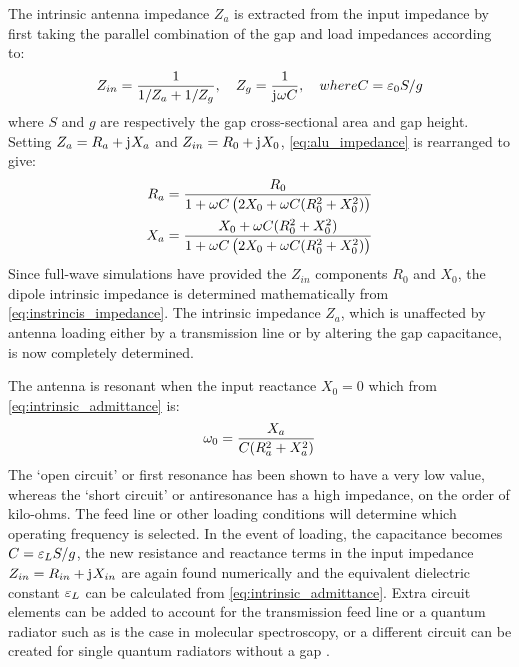 \documentclass[11pt]{article}
\begin{document}
The intrinsic antenna impedance $Z_a$ is extracted from the input impedance by first taking the parallel combination of the gap and load impedances according to:
%
\begin{equation}
  Z_{in} = \frac{1}{1 / Z_a + 1 / Z_g}, \quad  Z_g = \frac{1}{\mathrm{j}\mkern1mu \omega C}, \quad where C = \varepsilon_0 S/g
  \label{eq:alu_impedance}
\end{equation}
%
where $S$ and $g$ are respectively the gap cross-sectional area and gap height. Setting $Z_a = R_a + \mathrm{j}\mkern1mu X_a$ and $Z_{in} = R_0 + \mathrm{j}\mkern1mu X_0$,  \eqref{eq:alu_impedance} is rearranged to give:
%
\begin{subequations}
  \begin{align}
    R_a ={}& \frac{R_0}{1 + \omega C \left( 2 X_0 + \omega C (R_0^2 + X_0^2) \right)}
    \label{eq:intrinsic_resistance}\\
    X_a ={}& \frac{X_0 + \omega C (R_0^2 + X_0^2)} {1 + \omega C\left( 2 X_0 + \omega C (R_0^2 + X_0^2) \right)}
    \label{eq:intrinsic_admittance}
  \end{align}
  \label{eq:instrincis_impedance}
\end{subequations}
%
Since full-wave simulations have provided the $Z_{in}$ components $R_0$ and $X_0$, the dipole intrinsic impedance is determined mathematically from \eqref{eq:instrincis_impedance}. The intrinsic impedance $Z_a$, which is unaffected by antenna loading either by a transmission line or by altering the gap capacitance, is now completely determined.

The antenna is resonant when the input reactance $X_0 = 0$ which from \eqref{eq:intrinsic_admittance} is:
%
\begin{equation}
  \omega_{0} = \frac{X_a}{C (R_a^2 + X_a^2)}
  \label{eq:resonant_frequency_impedance}
\end{equation}
%
The `open circuit' or first resonance has been shown to have a very low value, whereas the `short circuit' or antiresonance has a high impedance, on the order of kilo-ohms. The feed line or other loading conditions will determine which operating frequency is selected. In the event of loading, the capacitance becomes $C = \varepsilon_L S /g$, the new resistance and reactance terms in the input impedance $Z_{in} = R_{in} + \mathrm{j}\mkern1mu X_{in}$ are again found numerically and the equivalent dielectric constant $\varepsilon_L$ can be calculated from \eqref{eq:intrinsic_admittance}. Extra circuit elements can be added to account for the transmission feed line or a quantum radiator such as is the case in molecular spectroscopy, or a different circuit can be created for single quantum radiators without a gap \cite{9781107014145}.
\end{document}
